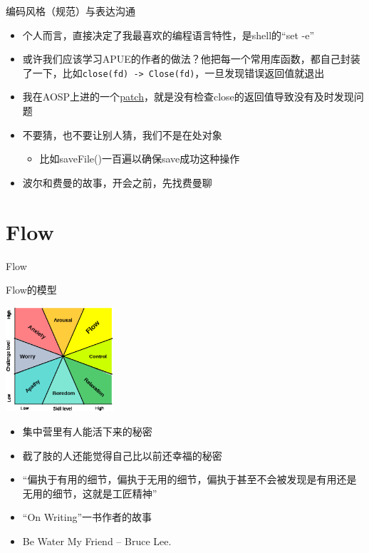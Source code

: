 \documentclass[presentation,dvipdfmx,CJKbookmarks]{beamer}
\begin{document}
\begin{CJK*}{UTF8}{simsun}
\begin{frame}[fragile,label={sec:orgf4bb7dc}]{编码风格（规范）与表达沟通}
\begin{itemize}
\begin{itemize}
\item 个人而言，直接决定了我最喜欢的编程语言特性，是\thinspace shell\thinspace 的“set -e”
\item 或许我们应该学习\thinspace APUE\thinspace 的作者的做法？他把每一个常用库函数，都自己封装了一下，比如\thinspace \texttt{close(fd) -> Close(fd)}，一旦发现错误返回值就退出
\item 我在\thinspace AOSP\thinspace 上进的一个\thinspace \href{https://android.googlesource.com/platform/frameworks/av/+/5225ba0\%255E\%2521/\#F1}{patch}，就是没有检查\thinspace close\thinspace 的返回值导致没有及时发现问题
\item 不要猜，也不要让别人猜，我们不是在处对象
\begin{itemize}
\item 比如\thinspace saveFile()\thinspace 一百遍以确保\thinspace save\thinspace 成功这种操作
\end{itemize}
\item 波尔和费曼的故事，开会之前，先找费曼聊
\end{itemize}
\end{itemize}
\end{frame}

\section{Flow}
\label{sec:orgdc2180e}

\begin{frame}[label={sec:org939f080}]{Flow}
\begin{block}{Flow\thinspace 的模型}
\begin{center}
\includegraphics[width=4cm]{./images/flow.ps}
\end{center}

\begin{itemize}
\item 集中营里有人能活下来的秘密
\item 截了肢的人还能觉得自己比以前还幸福的秘密
\item “偏执于有用的细节，偏执于无用的细节，偏执于甚至不会被发现是有用还是无用的细节，这就是工匠精神”
\item “On Writing”一书作者的故事
\item Be Water My Friend -- Bruce Lee.
\end{itemize}
\end{block}
\end{frame}


\end{CJK*}
\end{document}

